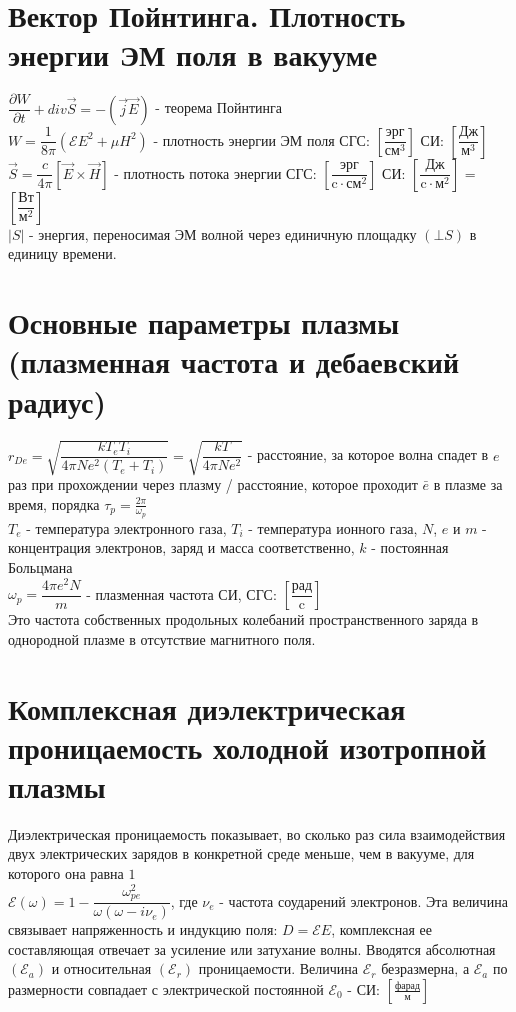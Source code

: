 \begin{multicols*}{2}
		\section{Вектор Пойнтинга. Плотность энергии ЭМ поля в вакууме}
		$\dfrac{\partial W}{\partial t} + div \vec{S} = - (\vec{j}  \vec{E})$ - теорема Пойнтинга\\
		$W = \dfrac{1}{8\pi} (\mathcal{E}E^2 + \mu H^2)$ - плотность энергии ЭМ поля \quad СГС: $\left[\dfrac{\text{эрг}}{\text{см}^{3}}\right]$ \quad СИ: $\left[\dfrac{\text{Дж}}{\text{м}^3}\right]$\\
		$\vec{S} = \dfrac{c}{4\pi} \left[\vec{E}\times \vec{H}\right]$ - плотность потока энергии \quad СГС: $\left[\dfrac{\text{эрг}}{\text{c}\cdot\text{см}^2}\right]$ \quad СИ: $\left[\dfrac{\text{Дж}}{\text{c}\cdot \text{м}^2}\right]$ = $\left[\dfrac{\text{Вт}}{\text{м}^2}\right]$\\
		$\left\lvert S\right\rvert$ - энергия, переносимая ЭМ волной через единичную площадку $(\bot S)$ в единицу времени.

		\section{Основные параметры плазмы (плазменная частота и дебаевский радиус)}
		$r_{De} = \sqrt{\dfrac{k T_e T_i}{4\pi N e^2(T_e + T_i)}} = \sqrt{\dfrac{k T}{4\pi N e^2}}$ - расстояние, за которое волна спадет в $e$ раз при прохождении через плазму / расстояние, которое проходит $\bar{e}$ в плазме за время, порядка $\tau_p = \frac{2\pi}{\omega_p}$\\
		$T_e$ - температура электронного газа, $T_i$ - температура ионного газа, $N$, $e$ и $m$ - концентрация электронов, заряд и масса соответственно, $k$ - постоянная Больцмана\\
		$\omega_p = \dfrac{4\pi e^2 N}{m}$ - плазменная частота \quad СИ, СГС: $\left[\dfrac{\text{рад}}{\text{c}}\right]$\\
		Это частота собственных продольных колебаний пространственного заряда в однородной плазме в отсутствие магнитного поля.

		\section{Комплексная диэлектрическая проницаемость холодной изотропной плазмы}
		Диэлектрическая проницаемость показывает, во сколько раз сила взаимодействия двух электрических зарядов в конкретной среде меньше, чем в вакууме, для которого она равна $1$\\
		$\mathcal{E} (\omega) = 1 - \dfrac{\omega_{pe}^2}{\omega(\omega - i\nu_e)}$, где $\nu_e$ - частота соударений электронов. Эта величина связывает напряженность и индукцию поля: $D = \mathcal{E} E$, комплексная ее составляющая отвечает за усиление или затухание волны.
		Вводятся абсолютная $(\mathcal{E}_a)$ и относительная $(\mathcal{E}_r)$ проницаемости. Величина $\mathcal{E} _{r}$ безразмерна, а ${\displaystyle \mathcal{E} _{a}}$ по размерности совпадает с электрической постоянной $\mathcal{E}_{0}$ - СИ: $\left[\frac{\text{фарад}}{\text{м}}\right]$


	\end{multicols*}

